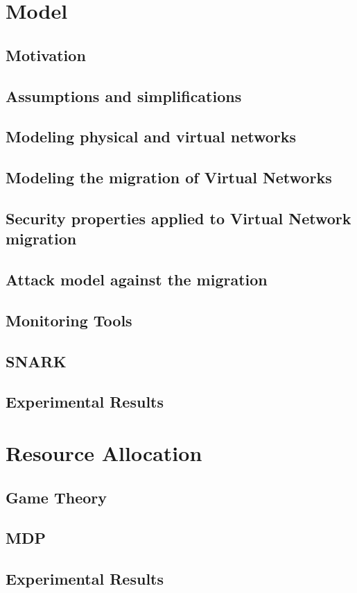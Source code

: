 \documentclass[a4paper, 11pt]{article}
\begin{document}
\newpage
\section{Model}
\subsection{Motivation}


\subsection{Assumptions and simplifications}


\subsection{Modeling physical and virtual networks}


\subsection{Modeling the migration of Virtual Networks}


\subsection{Security properties applied to Virtual Network migration}


\subsection{Attack model against the migration}



\subsection{Monitoring Tools}



\subsection{SNARK}

\subsection{Experimental Results}

\newpage
\section{Resource Allocation}
\subsection{Game Theory}
\subsection{MDP}
% 
\subsection{Experimental Results}




{}

\end{document}
